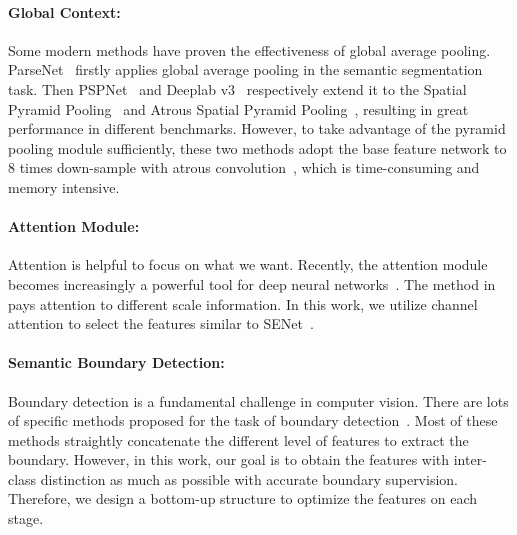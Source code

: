 \documentclass[10pt,twocolumn,letterpaper]{article}
\begin{document}
\vspace{-2ex}    
\paragraph{Global Context:} Some modern methods have proven the effectiveness of global average pooling. ParseNet~\cite{Liu-ICLR-ParseNet-2016} firstly applies global average pooling in the semantic segmentation task. Then PSPNet~\cite{Zhao-CVPR-PSPNet-2017} and Deeplab v3~\cite{Chen-Arxiv-Deeplabv3-2017} respectively extend it to the Spatial Pyramid Pooling~\cite{He-ECCV-SPP-2014} and Atrous Spatial Pyramid Pooling~\cite{Chen-Arxiv-Deeplabv2-2016}, resulting in great performance in different benchmarks. However, to take advantage of the pyramid pooling module sufficiently, these two methods adopt the base feature network to 8 times down-sample with atrous convolution~\cite{Chen-Arxiv-Deeplabv2-2016, Yu-ICLR-Dilate-2016}, which is time-consuming and memory intensive.
  
\vspace{-2ex}    
\paragraph{Attention Module:} Attention is helpful to focus on what we want. Recently, the attention module becomes increasingly a powerful tool for deep neural networks~\cite{Mnih-NIPS-RecurrentAttention-2014, Wang-CVPR-ResAttention-2017, Hu-Arxiv-SEnet-2017, Chen-CVPR-SCACNN-2017}. The method in \cite{Chen-CVPR-AttentionScale-2016} pays attention to different scale information. In this work, we utilize channel attention to select the features similar to SENet~\cite{Hu-Arxiv-SEnet-2017}.

\vspace{-2ex}    
\paragraph{Semantic Boundary Detection:} Boundary detection is a fundamental challenge in computer vision. There are lots of specific methods proposed for the task of boundary detection~\cite{Yu-CVPR-CASENet-2017, Xie-ICCV-HEAD-2015, Yang-CVPR-Contour-2016, Liu-CVPR-RCF-2017}. Most of these methods straightly concatenate the different level of features to extract the boundary. However, in this work, our goal is to obtain the features with inter-class distinction as much as possible with accurate boundary supervision. Therefore, we design a bottom-up structure to optimize the features on each stage.
\end{document}
